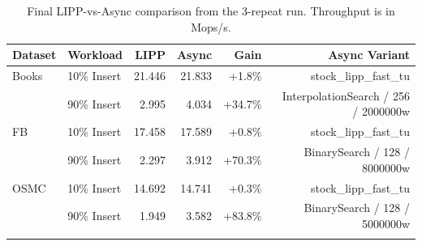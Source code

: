 \begin{table}[h]
\centering
\scriptsize
\setlength{\tabcolsep}{5pt}
\begin{tabular}{llrrrr}
\toprule
Dataset & Workload & LIPP & Async & Gain & Async Variant \\
\midrule
Books & 10\% Insert & 21.446 & 21.833 & +1.8\% & stock\_lipp\_fast\_tu \\
 & 90\% Insert & 2.995 & 4.034 & +34.7\% & InterpolationSearch / 256 / 2000000w \\
\addlinespace
FB & 10\% Insert & 17.458 & 17.589 & +0.8\% & stock\_lipp\_fast\_tu \\
 & 90\% Insert & 2.297 & 3.912 & +70.3\% & BinarySearch / 128 / 8000000w \\
\addlinespace
OSMC & 10\% Insert & 14.692 & 14.741 & +0.3\% & stock\_lipp\_fast\_tu \\
 & 90\% Insert & 1.949 & 3.582 & +83.8\% & BinarySearch / 128 / 5000000w \\
\addlinespace
\bottomrule
\end{tabular}
\caption{Final LIPP-vs-Async comparison from the 3-repeat run. Throughput is in Mops/s.}
\end{table}
